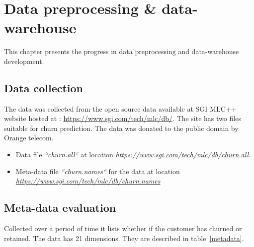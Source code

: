 \setlength{\footskip}{8mm}

\chapter{Data preprocessing \& data-warehouse}
\label{ch:dpdd}
This chapter presents the progress in data preprocessing and data-warehouse development.

\section{Data collection}
The data was collected from the open source data available at SGI MLC++ website hosted at : \url{https://www.sgi.com/tech/mlc/db/}. The site has two files suitable for churn prediction. The data was donated to the public domain by Orange telecom.
\begin{itemize}
	\item Data file \textit{``churn.all``} at location  \textit{\url{https://www.sgi.com/tech/mlc/db/churn.all}}.
	\item Meta-data file \textit{``churn.names``} for the data at location \textit{\url{https://www.sgi.com/tech/mlc/db/churn.names}}
\end{itemize}

\section{Meta-data evaluation}

Collected over a period of time it lists whether if the customer has churned or retained.
The data has 21 dimensions. They are described in table~\ref{metadata}.


